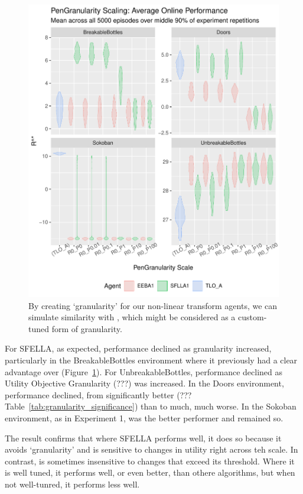 \begin{figure}
  \includegraphics[width=\columnwidth]{output/multirun_n100_pilot_granularityonline_PenGranularity.pdf}
  \caption{By creating `granularity' for our non-linear transform agents, we can simulate similarity with \tloA{}, which might be considered as a custom-tuned form of granularity.
  }
   \label{fig:exp3_main}
 \end{figure}
 
For SFELLA, as expected, performance declined as granularity increased, particularly in the BreakableBottles environment where it previously had a clear advantage over \tloA{} (Figure~\ref{fig:exp3_main}). For UnbreakableBottles, performance declined as Utility Objective Granularity (???) was increased. In the Doors environment, performance declined, from significantly better (??? Table~\ref{tab:granularity_significance}) than \tloA{} to much, much worse. In the Sokoban environment, as in Experiment 1, \tloA{} was the better performer and remained so.

The result confirms that where SFELLA performs well, it does so because it avoids `granularity' and is sensitive to changes in utility right across teh scale. In contrast, \tloA{} is sometimes insensitive to changes that exceed its threshold. Where it is well tuned, it performs well, or even better, than othere algorithms, but when not well-tunred, it performs less well.



